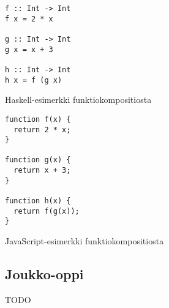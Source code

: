 \begin{code}
	\begin{verbatim}
f :: Int -> Int
f x = 2 * x

g :: Int -> Int
g x = x + 3

h :: Int -> Int
h x = f (g x)
\end{verbatim}
	\caption{Haskell-esimerkki funktiokompositiosta}
	\label{code:haskell_composition}
\end{code}
\bigskip
\begin{code}
	\begin{verbatim}
function f(x) {
  return 2 * x;
}

function g(x) {
  return x + 3;
}

function h(x) {
  return f(g(x));
}
\end{verbatim}
	\caption{JavaScript-esimerkki funktiokompositiosta}
	\label{code:javascript_composition}
\end{code}


\subsection{Joukko-oppi}

TODO

